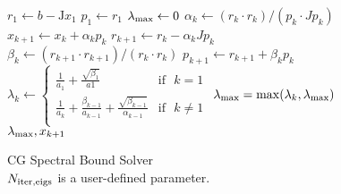 \begin{figure}[ht!]
  \begin{algorithm}[H]
    \caption{\label{alg:CG_Spectral_Bound_Solver}
      CG Spectral Bound Solver\\ $N_{\rm{iter,eigs}}$ is a user-defined parameter.
    }
    \begin{algorithmic}[1]
      \State $r_1 \leftarrow b - \mathrm{J}x_1$  
      \State $p_1 \leftarrow r_1$
      \State $\lambda_{\rm{max}} \leftarrow 0$
      \State $\alpha_k \leftarrow (r_{k} \cdot r_{k})/(p_k \cdot Jp_k)$
      \State $x_{k+1} \leftarrow x_{k} + \alpha_k p_k$
      \State $r_{k+1} \leftarrow r_{k} - \alpha_kJ p_k$
      \State $\beta_k \leftarrow (r_{k+1} \cdot r_{k+1})/(r_{k} \cdot r_{k})$ 
      \State $p_{k+1} \leftarrow r_{k+1} + \beta_kp_{k}$
      \State  $\lambda_k\leftarrow 
\begin{cases}
      \frac{1}{a_1} + \frac{\sqrt{\beta_1}}{a1} & \text{if} \,\,\,\, k = 1 \\[10pt]
    \frac{1}{a_{k}} + \frac{\beta_{k-1}}{a_{k-1}} + \frac{\sqrt{\beta_{k-1}}}{\alpha_{k-1}}  & \text{if} \,\,\,\, k \neq 1\\[10pt]
  \end{cases}
$\; 
\State  $\lambda_{\rm{max}} = \max(\lambda_k, \lambda_{\rm{max}})$
\EndFor\\
\Return $\lambda_{\rm{max}},x_{k + 1}$ 
  \EndFunction
    \end{algorithmic}
  \end{algorithm}
\end{figure}


